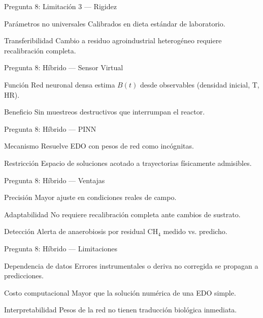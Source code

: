 \documentclass[aspectratio=169, 11pt]{beamer}
\begin{document}
\begin{frame}{Pregunta 8: Limitación 3 --- Rigidez}
\begin{block}{Parámetros no universales}
\footnotesize
Calibrados en dieta estándar de laboratorio.
\end{block}
\begin{alertblock}{Transferibilidad}
\footnotesize
Cambio a residuo agroindustrial heterogéneo requiere recalibración completa.
\end{alertblock}
\end{frame}

\begin{frame}{Pregunta 8: Híbrido --- Sensor Virtual}
\begin{exampleblock}{Función}
\footnotesize
Red neuronal densa estima $B(t)$ desde observables (densidad inicial, T, HR).
\end{exampleblock}
\begin{block}{Beneficio}
\footnotesize
Sin muestreos destructivos que interrumpan el reactor.
\end{block}
\end{frame}

\begin{frame}{Pregunta 8: Híbrido --- PINN}
\begin{block}{Mecanismo}
\footnotesize
Resuelve EDO con pesos de red como incógnitas.
\end{block}
\begin{exampleblock}{Restricción}
\footnotesize
Espacio de soluciones acotado a trayectorias físicamente admisibles.
\end{exampleblock}
\end{frame}

\begin{frame}{Pregunta 8: Híbrido --- Ventajas}
\begin{exampleblock}{Precisión}
\footnotesize
Mayor ajuste en condiciones reales de campo.
\end{exampleblock}
\begin{exampleblock}{Adaptabilidad}
\footnotesize
No requiere recalibración completa ante cambios de sustrato.
\end{exampleblock}
\begin{exampleblock}{Detección}
\footnotesize
Alerta de anaerobiosis por residual CH$_4$ medido vs. predicho.
\end{exampleblock}
\end{frame}

\begin{frame}{Pregunta 8: Híbrido --- Limitaciones}
\begin{alertblock}{Dependencia de datos}
\footnotesize
Errores instrumentales o deriva no corregida se propagan a predicciones.
\end{alertblock}
\begin{block}{Costo computacional}
\footnotesize
Mayor que la solución numérica de una EDO simple.
\end{block}
\begin{alertblock}{Interpretabilidad}
\footnotesize
Pesos de la red no tienen traducción biológica inmediata.
\end{alertblock}
\end{frame}
\end{document}
